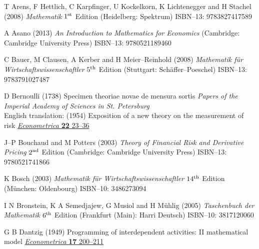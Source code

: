 \begin{thebibliography}{99}

T Arens, F Hettlich, C Karpfinger, U Kockelkorn,
K Lichtenegger and H Stachel
(2008) \emph{Mathematik}
$1^{\rm st}$ Edition (Heidelberg: Spektrum) ISBN--13: 9783827417589

A Asano
(2013) \emph{An Introduction to Mathematics for Economics} 
(Cambridge: Cambridge University Press) ISBN--13: 9780521189460


C Bauer, M Clausen, A Kerber and H Meier--Reinhold
(2008) \emph{Mathematik f\"ur Wirtschaftswissenschaftler}
$5^{\rm th}$ Edition (Stuttgart: Sch\"affer--Poeschel) ISBN--13: 
9783791027487

D Bernoulli
(1738) Specimen theoriae novae de mensura sortis
\emph{Papers of the Imperial Academy of Sciences in St. 
Petersburg}\\
English translation: (1954) Exposition of a new theory on the 
measurement of risk
\href{http://www.jstor.org/stable/1909829}{\emph{Econometrica} 
{\bf 22} 23--36}

J--P Bouchaud and M Potters
(2003) \emph{Theory of Financial Risk and Derivative Pricing}
$2^{\rm nd}$ Edition (Cambridge: Cambridge University Press)
ISBN--13: 9780521741866

K Bosch
(2003) \emph{Mathematik f\"ur Wirtschaftswissenschaftler}
$14^{\rm th}$ Edition (M\"unchen: Oldenbourg) ISBN--10: 3486273094

I N Bronstein, K A Semedjajew, G Musiol and H M\"uhlig
(2005) \emph{Taschenbuch der Mathematik}
$6^{\rm th}$ Edition (Frankfurt (Main): Harri Deutsch) ISBN--10: 
3817120060

G B Dantzig
(1949) Programming of interdependent activities: II mathematical 
model
\href{http://dx.doi.org/10.2307/1905523}{\emph{Econometrica} {\bf 
17} 200--211}


\end{thebibliography}
